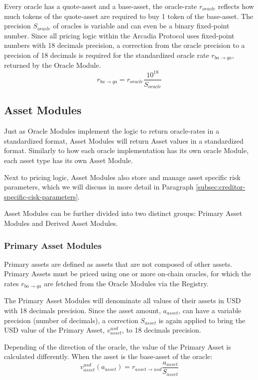 \documentclass[sigconf,nonacm]{acmart}
\begin{document}
Every oracle has a quote-asset and a base-asset, the oracle-rate $r_{oracle}$ reflects how much tokens of the quote-asset are required to buy 1 token of the base-asset.
The precision $S_{oracle}$ of oracles is variable and can even be a binary fixed-point number.
Since all pricing logic within the Arcadia Protocol uses fixed-point numbers with 18 decimals precision,
a correction from the oracle precision to a precision of 18 decimals is required for the standardized oracle rate $r_{ba\rightarrow qa}$, returned by the Oracle Module.
\begin{equation}
    \label{eq:oracle-module}
    r_{ba\rightarrow qa} = r_{oracle} \frac{10^{18}}{S_{oracle}}
\end{equation}

\subsection{Asset Modules}
Just as Oracle Modules implement the logic to return oracle-rates in a standardized format,
Asset Modules will return Asset values in a standardized format.
Similarly to how each oracle implementation has its own oracle Module, each asset type has its own Asset Module.

Next to pricing logic, Asset Modules also store and manage asset specific risk parameters, which we will discuss in more detail in Paragraph \ref{subsec:creditor-specific-cisk-parameters}.

Asset Modules can be further divided into two distinct groups: Primary Asset Modules and Derived Asset Modules.

\subsubsection{Primary Asset Modules}
Primary assets are defined as assets that are not composed of other assets.
Primary Assets must be priced using one or more on-chain oracles, for which the rates $r_{ba\rightarrow qa}$ are fetched from the Oracle Modules via the Registry.

The Primary Asset Modules will denominate all values of their assets in USD with 18 decimals precision.
Since the asset amount, $a_{asset}$, can have a variable precision (number of decimals),
a correction $S_{asset}$ is again applied to bring the USD value of the Primary Asset, $v_{asset}^{usd}$, to 18 decimals precision.

Depending of the direction of the oracle, the value of the Primary Asset is calculated differently.
When the asset is the base-asset of the oracle:
\begin{equation}
    v^{usd}_{asset}(a_{asset}) = r_{asset\rightarrow usd} \frac{a_{asset}}{S_{asset}}
\end{equation}
\end{document}
